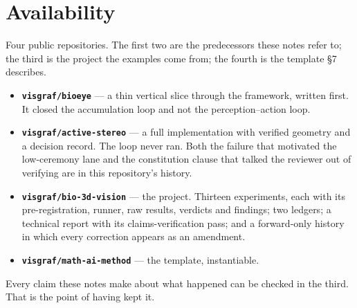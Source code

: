 \section{Availability}

Four public repositories. The first two are the predecessors these notes refer to; the third is the project the examples come from; the fourth is the template \S7 describes.

\begin{itemize}
\item \textbf{\texttt{visgraf/bioeye}} --- a thin vertical slice through the framework, written first. It closed the accumulation loop and not the perception--action loop.
\item \textbf{\texttt{visgraf/active-stereo}} --- a full implementation with verified geometry and a decision record. The loop never ran. Both the failure that motivated the low-ceremony lane and the constitution clause that talked the reviewer out of verifying are in this repository's history.
\item \textbf{\texttt{visgraf/bio-3d-vision}} --- the project. Thirteen experiments, each with its pre-registration, runner, raw results, verdicts and findings; two ledgers; a technical report with its claims-verification pass; and a forward-only history in which every correction appears as an amendment.
\item \textbf{\texttt{visgraf/math-ai-method}} --- the template, instantiable.
\end{itemize}

Every claim these notes make about what happened can be checked in the third. That is the point of having kept it.
